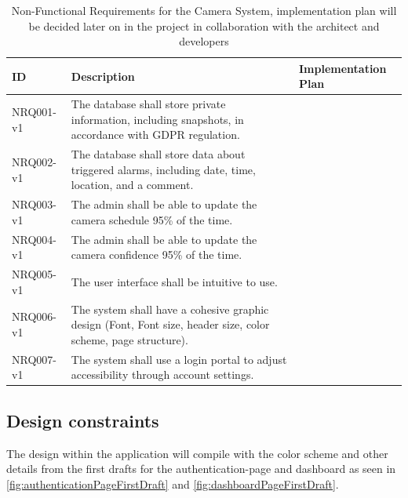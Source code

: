 \documentclass{article}
\begin{document}
\begin{table}[h!]
\centering
\begin{tabular}{|l|p{8cm}|p{5cm}|}
\hline
\textbf{ID} & \textbf{Description} & \textbf{Implementation Plan} \\
\hline
NRQ001-v1 & The database shall store private information, including snapshots, in accordance with GDPR regulation. &  \\
\hline
NRQ002-v1 & The database shall store data about triggered alarms, including date, time, location, and a comment. &  \\
\hline
NRQ003-v1 & The admin shall be able to update the camera schedule 95\% of the time. &  \\
\hline
NRQ004-v1 & The admin shall be able to update the camera confidence 95\% of the time. &  \\
\hline
NRQ005-v1 & The user interface shall be intuitive to use. &  \\
\hline
NRQ006-v1 & The system shall have a cohesive graphic design (Font, Font size, header size, color scheme, page structure). &  \\
\hline
NRQ007-v1 & The system shall use a login portal to adjust accessibility through account settings. &  \\
\hline
\end{tabular}
\captionsetup{justification=centering}
\caption{Non-Functional Requirements for the Camera System, implementation plan will be decided later on in the project in collaboration with the architect and developers}
\label{table:nonfunctional_requirements}
\end{table}

\clearpage


\subsection{Design constraints}
The design within the application will compile with the color scheme and other details from the first drafts for the authentication-page and dashboard as seen in \ref{fig:authenticationPageFirstDraft} and \ref{fig:dashboardPageFirstDraft}. \\
\end{document}

